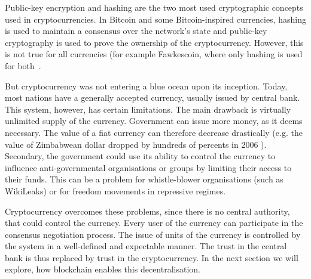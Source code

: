 Public-key encryption and hashing are the two most used cryptographic concepts used in cryptocurrencies. In Bitcoin and some Bitcoin-inspired currencies, hashing is used to maintain a consensus over the network's state and public-key cryptography is used to prove the ownership of the cryptocurrency. However, this is not true for all currencies (for example Fawkescoin, where only hashing is used for both~\cite{Bonneau2014FawkescoinCryptography}.

But cryptocurrency was not entering a blue ocean upon its inception. Today, most nations have a generally accepted currency, usually issued by central bank. This system, however, has certain limitations. The main drawback is virtually unlimited supply of the currency. Government can issue more money, as it deems necessary. The value of a fiat currency can therefore decrease drastically (e.g. the value of Zimbabwean dollar dropped by hundreds of percents in 2006 \footnotemark ). Secondary, the government could use its ability to control the currency to influence anti-governmental organisations or groups by limiting their access to their funds. This can be a problem for whistle-blower organisations (such as WikiLeaks) or for freedom movements in repressive regimes.
% 

Cryptocurrency overcomes these problems, since there is no central authority, that could control the currency. Every user of the currency can participate in the consensus negotiation process. The issue of units of the currency is controlled by the system in a well-defined and expectable manner. The trust in the central bank is thus replaced by trust in the cryptocurrency. In the next section we will explore, how blockchain enables this decentralisation.